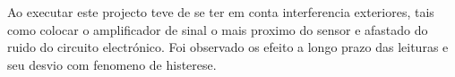 \begin{columns}
{{\begin{minipage}[b!]{\linewidth}
\begin{minipage}[b!]{.2\linewidth}
			\end{minipage}
			\begin{minipage}[b!]{.6\linewidth}
				Ao executar este projecto teve de se ter em conta interferencia exteriores, tais como colocar o amplificador de sinal o mais proximo do sensor e afastado do ruido do circuito electrónico. Foi observado os efeito a longo prazo das leituras e seu desvio com fenomeno de histerese.
				\vspace{1cm}
			\end{minipage}
		\end{minipage}
	}
	\vspace{5cm}
}
\end{columns}
